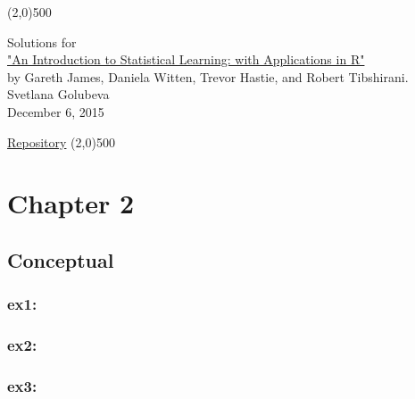 \documentclass[a4paper,12pt,titlepage]{article} %
\begin{document}
\begin{titlepage}

\begin{center}
	\line(2,0){500}
\end{center}

\vspace{60pt}

\begin{center}	
	{\Large{Solutions for}}\\
	\vspace{20pt}
	\href{http://www.springer.com/us/book/9781461471370}{\Huge{"An Introduction to Statistical Learning: with Applications in R"}}\\
	\vspace{20pt}
	{\LARGE{by Gareth James, Daniela Witten, Trevor Hastie, and Robert Tibshirani.}}\\
	\vspace{20pt}
	Svetlana Golubeva\\
	\vspace{20pt}
	December 6, 2015
\end{center}

\vspace{\fill}
\begin{center}
	\href{https://github.com/attillax/ISL}{Repository}
	\line(2,0){500}
\end{center}

\end{titlepage}

\tableofcontents

\newpage
\section{Chapter 2}
\subsection{Conceptual}
\subsubsection{ex1:}
\subsubsection{ex2:}
\subsubsection{ex3:}
\end{document}
